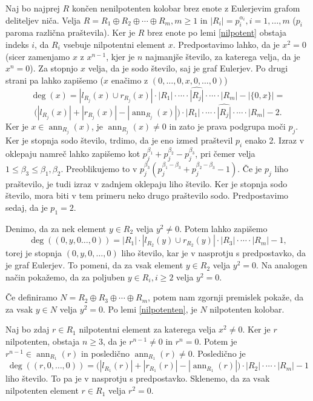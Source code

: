 \documentclass[a4paper, 12pt]{amsart}
\theoremstyle{definition} %
\theoremstyle{plain} %
\DeclareMathOperator{\ann}{ann}
\begin{document}
\proof
Naj bo najprej $R$ končen nenilpotenten kolobar brez enote z Eulerjevim grafom deliteljev niča. Velja $R=R_1\oplus R_2\oplus \cdots \oplus R_m, m\ge 1$ in $|R_i|=p_i^{\alpha_i}, i=1,\dots,m$ ($p_i$ paroma različna praštevila). Ker je $R$ brez enote po lemi \ref{nilpotent} obstaja indeks $i$, da $R_i$ vsebuje nilpotentni element $x$. Predpostavimo lahko, da je $x^2 = 0$ (sicer zamenjamo $x$ z $x^{n-1}$, kjer je $n$ najmanjše število, za katerega velja, da je $x^n=0$). Za stopnjo $x$ velja, da je sodo število, saj je graf Eulerjev. Po  drugi  strani pa lahko zapišemo ($x$ enačimo z $(0,\dots,0,x,0,\dots,0)$)
$$
\deg(x) = |l_{R_j}(x) \cup r_{R_j}(x)|\cdot |R_1|\cdot \cdots \cdot \widehat{|R_j|} \cdot \cdots \cdot |R_m| - |\{0,x\}| = 
$$
$$
\big( |l_{R_j}(x)| + |r_{R_j}(x)| - |\ann_{R_j}(x)| \big)\cdot |R_1| \cdot \cdots \cdot \widehat{|R_j|} \cdot \cdots \cdot |R_m| - 2.
$$
Ker je $x\in \ann_{R_j}(x)$, je $\ann_{R_j}(x)\neq 0$ in zato je prava podgrupa moči $p_j$. Ker je stopnja sodo število, trdimo, da je eno izmed praštevil $p_i$ enako 2. Izraz v oklepaju namreč lahko zapišemo kot $p_j^{ \beta_1} + p_j^{\beta_2} - p_j^{\beta_3}$, pri čemer velja $1\le \beta_3 \le \beta_1,\beta_2$. Preoblikujemo to v $p_j^{\beta_3}(p_j^{\beta_1 - \beta_3} + p_j^{\beta_2 - \beta_3 } -1)$. Če je $p_j$ liho praštevilo, je tudi izraz v zadnjem oklepaju liho število. Ker je stopnja sodo število, mora biti v tem primeru neko drugo praštevilo sodo. Predpostavimo sedaj, da je $p_1 = 2$.

Denimo, da za nek element $y\in R_2$ velja $y^2 \neq 0$. Potem lahko zapišemo
$$
\deg((0,y,0\dots,0)) =  |R_1|\cdot |l_{R_2}(y)\cup r_{R_2}(y)|\cdot |R_3| \cdot \cdots \cdot |R_m| - 1,
$$
torej je stopnja $(0,y,0,\dots,0)$ liho število, kar je v nasprotju s predpostavko, da je graf Eulerjev. To pomeni, da za vsak element $y\in R_2$ velja $y^2 = 0$. Na analogen način pokažemo, da za poljuben $y\in R_i, i\ge 2$ velja $y^2 = 0$. 

Če definiramo $N=R_2 \oplus R_3 \oplus \cdots \oplus R_m$, potem nam zgornji premislek pokaže, da za vsak $y \in N$ velja $y^2 = 0$. Po lemi \ref{nilpotenten}, je $N$ nilpotenten kolobar.

Naj bo zdaj $r\in R_1$ nilpotentni element za katerega velja $x^2  \neq 0$. Ker je $r$ nilpotenten, obstaja $n\ge 3$, da je $r^{n-1}\neq 0$ in $r^n = 0$. Potem je $r^{n-1}\in \ann_{R_1}(r)$ in posledično $\ann_{R_1}(r) \neq 0$. Posledično je 
$$
\deg((r,0,\dots,0)) = \big( |l_{R_1}(r)| + |r_{R_1}(r)| - |\ann_{R_1}(r)| \big)\cdot |R_2| \cdot \cdots \cdot |R_m| - 1
$$
liho število. To pa je v nasprotju s predpostavko. Sklenemo, da za vsak nilpotenten element $r\in R_1$ velja $r^2=0$.
\end{document}
